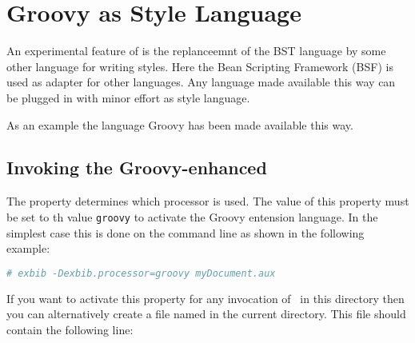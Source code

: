 
\newenvironment{methods}{\begin{description}\def\method##1{\item[##1]\ \\}%
}{\end{description}}

\section{Groovy as Style Language}

An experimental feature of \ExBib{} is the replanceemnt of the BST
language by some other language for writing styles. Here the Bean
Scripting Framework (BSF) is used as adapter for other languages. Any
language made available this way can be plugged in with minor effort
as style language.

As an example the language Groovy has been made available this way.


\subsection{Invoking the Groovy-enhanced \ExBib}

The property  determines which processor is
used. The value of this property must be set to th value \verb|groovy|
to activate the Groovy entension language. In the simplest case this
is done on the command line as shown in the following example:

\begin{lstlisting}[language=sh]
# exbib -Dexbib.processor=groovy myDocument.aux
\end{lstlisting}

If you want to activate this property for any invocation of \ExBib\ in
this directory then you can alternatively create a file named
 in the current directory. This file should contain the
following line:

